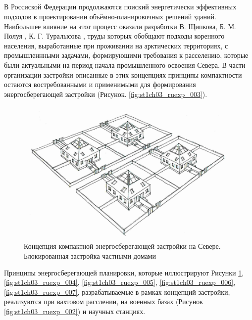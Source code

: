 \subsection{\scAssesmentExp}
% 
В Россиской Федерации продолжаются поиский энергетически эффективных подходов в проектировании объёмно-планировочных решений зданий.
Наибольшее влияние на этот процесс оказали разработки В. Щипкова, Б. М. Полуя \cite{1989up_Poluyi_ArchGradoVsurovomKlimate}, К. Г. Туралысова \cite{1996up_Turalysov_BiospherRasseleniye},
труды которых обобщают подходы коренного населения, выработанные при проживании на арктических территориях,
с промышленнными задачами, формирующими требования к расселению, которые были актуальными на период начала промышленного освоения Севера.
В части организации застройки описанные в этих концепциях принципы компактности остаются востребованными и применимыми для формирования энергосберегающей застройки (Рисунок. \ref{fig:st1ch03_ruexp_003}).
\clearpage
\begin{figure}
    \centering
    \includegraphics[width=\textwidth]{assets/figures/st1ch03_ruexp_001.png}
    \caption{Концепция компактной энергосберегающей застройки на Севере. Блокированная застройка частными домами}
    \label{fig:st1ch03_ruexp_001}
  \end{figure}


Принципы энергосберегающей планировки, которые иллюстрируют Рисунки \ref{fig:st1ch03_ruexp_001}, \ref{fig:st1ch03_ruexp_004}, \ref{fig:st1ch03_ruexp_005}, \ref{fig:st1ch03_ruexp_006}, \ref{fig:st1ch03_ruexp_007},
разрабатываемые в рамках концепций застройки, реализуются при вахтовом расслении, на военных базах (Рисунок \ref{fig:st1ch03_ruexp_002}) и научных станциях.


